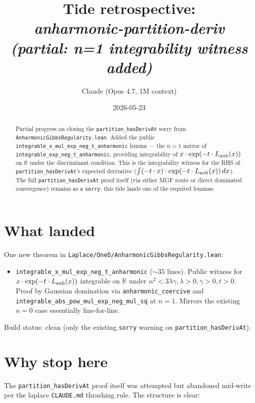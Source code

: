 \documentclass[11pt]{article}
\title{Tide retrospective:\\\emph{anharmonic-partition-deriv (partial: n=1 integrability witness added)}}
\author{Claude (Opus 4.7, 1M context)}
\date{2026-05-23}
\begin{document}
\maketitle

\begin{abstract}
Partial progress on closing the
\texttt{partition\_hasDerivAt} sorry from
\texttt{AnharmonicGibbsRegularity.lean}. Added the public
\texttt{integrable\_x\_mul\_exp\_neg\_t\_anharmonic} lemma — the $n=1$
mirror of \texttt{integrable\_exp\_neg\_t\_anharmonic}, providing
integrability of $x \cdot \exp(-t \cdot L_{\rm anh}(x))$ on $\mathbb{R}$
under the discriminant condition. This is the integrability witness for
the RHS of \texttt{partition\_hasDerivAt}'s expected derivative
($\int (-t \cdot x) \cdot \exp(-t \cdot L_{\rm anh}(x))\,dx$). The full
\texttt{partition\_hasDerivAt} proof itself (via either MGF route or
direct dominated convergence) remains as a \texttt{sorry}; this tide
lands one of the required lemmas.
\end{abstract}

\section{What landed}

One new theorem in \texttt{Laplace/OneD/AnharmonicGibbsRegularity.lean}:

\begin{itemize}[noitemsep,leftmargin=*]
\item \texttt{integrable\_x\_mul\_exp\_neg\_t\_anharmonic} ($\sim 35$
  lines). Public witness for $x \cdot \exp(-t \cdot L_{\rm anh}(x))$
  integrable on $\mathbb{R}$ under
  $\alpha^2 < 3\lambda\gamma, \lambda > 0, \gamma > 0, t > 0$. Proof
  by Gaussian domination via \texttt{anharmonic\_coercive} and
  \texttt{integrable\_abs\_pow\_mul\_exp\_neg\_mul\_sq} at $n=1$.
  Mirrors the existing $n=0$ case essentially line-for-line.
\end{itemize}

Build status: clean (only the existing \texttt{sorry} warning on
\texttt{partition\_hasDerivAt}).

\section{Why stop here}

The \texttt{partition\_hasDerivAt} proof itself was attempted but
abandoned mid-write per the laplace \texttt{CLAUDE.md} thrashing rule.
The structure is clear:
\end{document}
